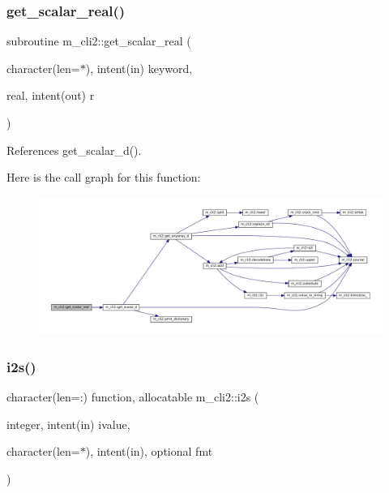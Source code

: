 \subsubsection{\texorpdfstring{get\+\_\+scalar\+\_\+real()}{get\_scalar\_real()}}
{\footnotesize\ttfamily subroutine m\+\_\+cli2\+::get\+\_\+scalar\+\_\+real (\begin{DoxyParamCaption}\item[{character(len=$\ast$), intent(in)}]{keyword,  }\item[{real, intent(out)}]{r }\end{DoxyParamCaption})\hspace{0.3cm}{\ttfamily [private]}}



References get\+\_\+scalar\+\_\+d().

Here is the call graph for this function\+:\nopagebreak
\begin{figure}[H]
\begin{center}
\leavevmode
\includegraphics[width=350pt]{namespacem__cli2_ad089d91c66626de91bcda84523e80b54_cgraph}
\end{center}
\end{figure}
\mbox{\label{namespacem__cli2_aa106d3533fd6d4845f0b3e94b2a79ffb}} 
\subsubsection{\texorpdfstring{i2s()}{i2s()}}
{\footnotesize\ttfamily character(len=\+:) function, allocatable m\+\_\+cli2\+::i2s (\begin{DoxyParamCaption}\item[{integer, intent(in)}]{ivalue,  }\item[{character(len=$\ast$), intent(in), optional}]{fmt }\end{DoxyParamCaption})\hspace{0.3cm}{\ttfamily [private]}}



